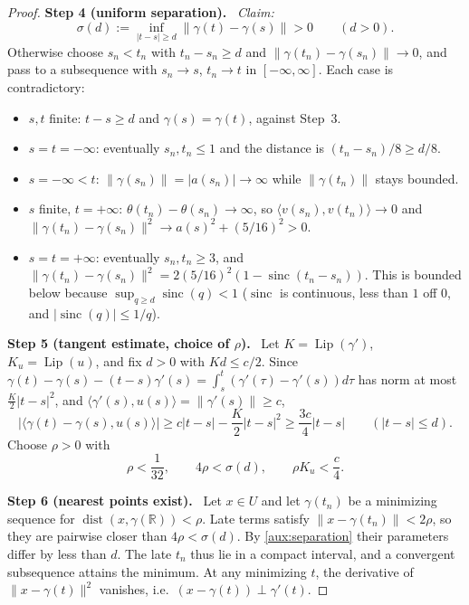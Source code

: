 \documentclass[11pt]{article}
\newcommand{\R}{\mathbb R}
\newcommand{\norm}[1]{\lVert #1\rVert}
\newcommand{\ip}[2]{\langle #1,#2\rangle}
\DeclareMathOperator{\Lip}{Lip}
\DeclareMathOperator{\dist}{dist}
\DeclareMathOperator{\sinc}{sinc}
\newcommand{\step}[1]{\par\smallskip\noindent\textbf{Step #1.}\ }
\theoremstyle{definition}
\numberwithin{equation}{section}
\begin{document}
\begin{proof}
\step{4 (uniform separation)} \emph{Claim:}
\begin{equation}\label{aux:separation}
 \sigma(d):=\inf_{|t-s|\ge d}\norm{\gamma(t)-\gamma(s)}>0\qquad(d>0).
\end{equation}
Otherwise choose $s_n<t_n$ with $t_n-s_n\ge d$ and
$\norm{\gamma(t_n)-\gamma(s_n)}\to0$, and pass to a subsequence with
$s_n\to s$, $t_n\to t$ in $[-\infty,\infty]$. Each case is contradictory:
\begin{itemize}
\item $s,t$ finite: $t-s\ge d$ and $\gamma(s)=\gamma(t)$, against Step~3.
\item $s=t=-\infty$: eventually $s_n,t_n\le1$ and the distance is
 $(t_n-s_n)/8\ge d/8$.
\item $s=-\infty<t$: $\norm{\gamma(s_n)}=|a(s_n)|\to\infty$ while
 $\norm{\gamma(t_n)}$ stays bounded.
\item $s$ finite, $t=+\infty$: $\theta(t_n)-\theta(s_n)\to\infty$, so
 $\ip{v(s_n)}{v(t_n)}\to0$ and
 $\norm{\gamma(t_n)-\gamma(s_n)}^2\to a(s)^2+(5/16)^2>0$.
\item $s=t=+\infty$: eventually $s_n,t_n\ge3$, and
 $\norm{\gamma(t_n)-\gamma(s_n)}^2=2(5/16)^2(1-\sinc(t_n-s_n))$. This is
 bounded below because $\sup_{q\ge d}\sinc(q)<1$ ($\sinc$ is continuous,
 less than $1$ off $0$, and $|\sinc(q)|\le1/q$).
\end{itemize}

\step{5 (tangent estimate, choice of $\rho$)} Let $K=\Lip(\gamma')$,
$K_u=\Lip(u)$, and fix $d>0$ with $Kd\le c/2$. Since
$\gamma(t)-\gamma(s)-(t-s)\gamma'(s)=\int_s^t(\gamma'(\tau)-\gamma'(s))d\tau$
has norm at most $\frac K2|t-s|^2$, and
$\ip{\gamma'(s)}{u(s)}=\norm{\gamma'(s)}\ge c$,
\begin{equation}\label{aux:tangent}
 |\ip{\gamma(t)-\gamma(s)}{u(s)}|\ge c|t-s|-\frac K2|t-s|^2
 \ge\frac{3c}4|t-s|\qquad(|t-s|\le d).
\end{equation}
Choose $\rho>0$ with
\begin{equation}\label{aux:radius}
 \rho<\frac1{32},\qquad4\rho<\sigma(d),\qquad\rho K_u<\frac c4.
\end{equation}

\step{6 (nearest points exist)} Let $x\in U$ and let $\gamma(t_n)$ be a
minimizing sequence for $\dist(x,\gamma(\R))<\rho$. Late terms satisfy
$\norm{x-\gamma(t_n)}<2\rho$, so they are pairwise closer than
$4\rho<\sigma(d)$. By \eqref{aux:separation} their parameters differ by
less than $d$. The late $t_n$ thus lie in a compact interval, and a
convergent subsequence attains the minimum. At any minimizing $t$, the
derivative of $\norm{x-\gamma(t)}^2$ vanishes, i.e.\
$(x-\gamma(t))\perp\gamma'(t)$.


\end{proof}
\end{document}
